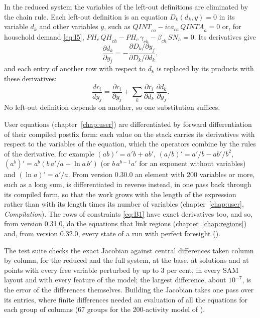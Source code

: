In the reduced system the variables of the left-out definitions are
eliminated by the chain rule. Each left-out definition is an equation
$D_k(d_k, y) = 0$ in its variable $d_k$ and other variables $y$, such as
$\mathit{QINT}_{ca} - \mathit{ica}_{ca}\,\mathit{QINTA}_a = 0$ or, for household
demand \eqref{eq:I5}, $\mathit{PH}_c\, \mathit{QH}_{ch} - \mathit{PH}_c\,
\gamma_{ch} - \beta_{ch}\, \mathit{SN}_h = 0$. Its derivatives give
\begin{equation*}
\frac{\partial d_k}{\partial y_j} = -\frac{\partial D_k / \partial y_j}{\partial D_k / \partial d_k},
\end{equation*}
and each entry of another row with respect to $d_k$ is replaced by its
products with these derivatives:
\begin{equation*}
\frac{d r_i}{d y_j} = \frac{\partial r_i}{\partial y_j} + \sum_k \frac{\partial r_i}{\partial d_k}\, \frac{\partial d_k}{\partial y_j}.
\end{equation*}
No left-out definition depends on another, so one substitution suffices.

User equations (chapter~\ref{chap:user}) are differentiated by forward
differentiation of their compiled postfix form: each value on the stack
carries its derivatives with respect to the variables of the equation, which
the operators combine by the rules of the derivative, for example $(ab)' =
a'b + ab'$, $(a/b)' = a'/b - a b'/b^2$, $(a^b)' = a^b (b\, a'/a + \ln a\,
b')$ (or $b\, a^{b-1} a'$ for an exponent without variables) and $(\ln a)' =
a'/a$. From version 0.30.0 an element with 200 variables or more, such as a
long sum, is differentiated in reverse instead, in one pass back through
its compiled form, so that the work grows with the length of the expression
rather than with its length times its number of variables (chapter~\ref{chap:user},
\emph{Compilation}). The rows of constraints \eqref{eq:B1} have exact
derivatives too, and so, from version 0.31.0, do the equations that link
regions (chapter~\ref{chap:regions}) and, from version 0.32.0, every state
of a run with perfect foresight ().

The test suite checks the exact Jacobian against central differences taken
column by column, for the reduced and the full system, at the base, at
solutions and at points with every free variable perturbed by up to 3 per
cent, in every SAM layout and with every feature of the model; the largest
difference, about $10^{-7}$, is the error of the differences themselves. Building the
Jacobian takes one pass over its entries, where finite differences needed an
evaluation of all the equations for each group of columns (67 groups for the
200-activity model of ).

